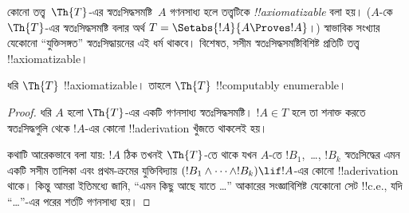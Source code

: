 \documentclass[../../../include/open-logic-section]{subfiles}
\begin{document}


কোনো তত্ত্ব~$\Th{T}$-এর স্বতঃসিদ্ধসমষ্টি~$A$ গণনসাধ্য হলে তত্ত্বটিকে
\emph{!!{axiomatizable}} বলা হয়। ($A$-কে $\Th{T}$-এর স্বতঃসিদ্ধসমষ্টি
বলার অর্থ $T = \Setabs{!A}{A \Proves !A}$।) স্বাভাবিক সংখ্যার যেকোনো
``যুক্তিসঙ্গত'' স্বতঃসিদ্ধায়নের এই ধর্ম থাকবে। বিশেষত, সসীম
স্বতঃসিদ্ধসমষ্টিবিশিষ্ট প্রতিটি তত্ত্ব !!{axiomatizable}।

\begin{lem}
ধরি $\Th{T}$ !!{axiomatizable}। তাহলে $\Th{T}$
!!{computably
enumerable}।
\end{lem}

\begin{proof}
ধরি $A$ হলো $\Th{T}$-এর একটি গণনসাধ্য স্বতঃসিদ্ধসমষ্টি। $!A \in T$
হলে তা শনাক্ত করতে স্বতঃসিদ্ধগুলি থেকে $!A$-এর কোনো !!a{derivation}
খুঁজতে থাকলেই হয়।

কথাটি আরেকভাবে বলা যায়: $!A$ ঠিক তখনই $\Th{T}$-তে থাকে যখন $A$-তে
$!B_1$,~\dots, $!B_k$ স্বতঃসিদ্ধের এমন একটি সসীম তালিকা এবং প্রথম-ক্রমের
যুক্তিবিদ্যায় $(!B_1 \land \dots \land !B_k) \lif !A$-এর কোনো
!!a{derivation} থাকে। কিন্তু আমরা ইতিমধ্যে জানি, ``এমন কিছু আছে যাতে
\dots'' আকারের সংজ্ঞাবিশিষ্ট যেকোনো সেট !!{c.e.}, যদি ``\dots''-এর
পরের শর্তটি গণনসাধ্য হয়।
\end{proof}
\end{document}
